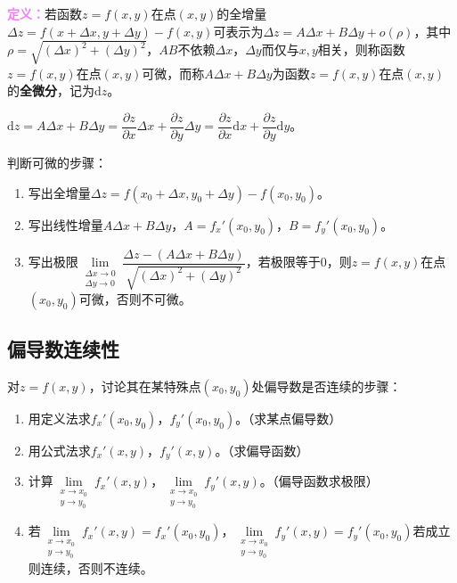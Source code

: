 \documentclass[UTF8, 12pt]{ctexart}
\begin{document}
\textcolor{violet}{\textbf{定义：}}若函数$z=f(x,y)$在点$(x,y)$的全增量$\Delta z=f(x+\Delta x,y+\Delta y)-f(x,y)$可表示为$\Delta z=A\Delta x+B\Delta y+o(\rho)$，其中$\rho=\sqrt{(\Delta x)^2+(\Delta y)^2}$，$AB$不依赖$\Delta x$，$\Delta y$而仅与$x,y$相关，则称函数$z=f(x,y)$在点$(x,y)$可微，而称$A\Delta x+B\Delta y$为函数$z=f(x,y)$在点$(x,y)$的\textbf{全微分}，记为$\textrm{d}z$。

$\textrm{d}z=A\Delta x+B\Delta y=\dfrac{\partial z}{\partial x}\Delta x+\dfrac{\partial z}{\partial y}\Delta y=\dfrac{\partial z}{\partial x}\textrm{d}x+\dfrac{\partial z}{\partial y}\textrm{d}y$。

判断可微的步骤：

\begin{enumerate}
    \item 写出全增量$\Delta z=f(x_0+\Delta x,y_0+\Delta y)-f(x_0,y_0)$。
    \item 写出线性增量$A\Delta x+B\Delta y$，$A=f_x'(x_0,y_0)$，$B=f_y'(x_0,y_0)$。
    \item 写出极限$\lim\limits_{\substack{\Delta x\to0\\\Delta y\to0}}\dfrac{\Delta z-(A\Delta x+B\Delta y)}{\sqrt{(\Delta x)^2+(\Delta y)^2}}$，若极限等于0，则$z=f(x,y)$在点$(x_0,y_0)$可微，否则不可微。
\end{enumerate}

\subsection{偏导数连续性}

对$z=f(x,y)$，讨论其在某特殊点$(x_0,y_0)$处偏导数是否连续的步骤：

\begin{enumerate}
    \item 用定义法求$f_x'(x_0,y_0)$，$f_y'(x_0,y_0)$。（求某点偏导数）
    \item 用公式法求$f_x'(x,y)$，$f_y'(x,y)$。（求偏导函数）
    \item 计算$\lim\limits_{\substack{x\to x_0\\y\to y_0}}f_x'(x,y)$，$\lim\limits_{\substack{x\to x_0\\y\to y_0}}f_y'(x,y)$。（偏导函数求极限）
    \item 若$\lim\limits_{\substack{x\to x_0\\y\to y_0}}f_x'(x,y)=f_x'(x_0,y_0)$，$\lim\limits_{\substack{x\to x_0\\y\to y_0}}f_y'(x,y)=f_y'(x_0,y_0)$若成立则连续，否则不连续。
\end{enumerate}
\end{document}
